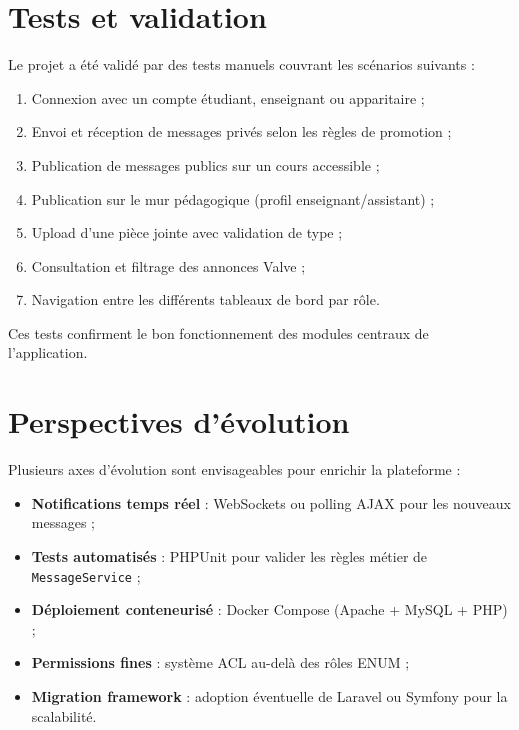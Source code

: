 \documentclass[12pt,a4paper]{article}
\begin{document}
\section{Tests et validation}

Le projet a été validé par des tests manuels couvrant les scénarios suivants :

\begin{enumerate}
  \item Connexion avec un compte étudiant, enseignant ou apparitaire ;
  \item Envoi et réception de messages privés selon les règles de promotion ;
  \item Publication de messages publics sur un cours accessible ;
  \item Publication sur le mur pédagogique (profil enseignant/assistant) ;
  \item Upload d'une pièce jointe avec validation de type ;
  \item Consultation et filtrage des annonces Valve ;
  \item Navigation entre les différents tableaux de bord par rôle.
\end{enumerate}

Ces tests confirment le bon fonctionnement des modules centraux de l'application.

\section{Perspectives d'évolution}

Plusieurs axes d'évolution sont envisageables pour enrichir la plateforme :

\begin{itemize}
  \item \textbf{Notifications temps réel} : WebSockets ou polling AJAX pour les nouveaux messages ;
  \item \textbf{Tests automatisés} : PHPUnit pour valider les règles métier de \texttt{MessageService} ;
  \item \textbf{Déploiement conteneurisé} : Docker Compose (Apache + MySQL + PHP) ;
  \item \textbf{Permissions fines} : système ACL au-delà des rôles ENUM ;
  \item \textbf{Migration framework} : adoption éventuelle de Laravel ou Symfony pour la scalabilité.
\end{itemize}
\end{document}
